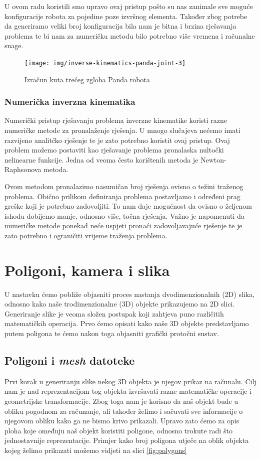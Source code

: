\documentclass[times, utf8, diplomskirad]{fer}
\begin{document}
U ovom radu koristili smo upravo ovaj pristup pošto su nas zanimale sve moguće konfiguracije robota za pojedine poze izvršnog elementa.
Također zbog potrebe da generiramo veliki broj konfiguracija bila nam je bitna i brzina rješavanja problema te bi nam za numeričku metodu bilo potrebno više vremena i računalne snage.
\begin{figure}[H]
    \centering
    \texttt{[image: img/inverse-kinematics-panda-joint-3]}
    \caption{Izračun kuta trećeg zgloba Panda robota}
    \label{fig:inv-kin-panda-joint-3}
\end{figure}

\subsection{Numerička inverzna kinematika}
Numerički pristup rješavanju problema inverzne kinematike koristi razne numeričke metode za pronalaženje rješenja.
U mnogo slučajeva nećemo imati razvijeno analitčko rješenje te je zato potrebno koristit ovaj pristup.
Ovaj problem možemo postaviti kao rješavanje problema pronalaska nultočki nelinearne funkcije.
Jedna od veoma često korištenih metoda je Newton-Raphsonova metoda.

Ovom metodom pronalazimo nasumičan broj rješenja ovisno o težini traženog problema.
Obično prilikom definiranja problema postavljamo i određeni prag greške koji je potrebno zadovoljiti.
To nam daje mogućnost da ovisno o željenom ishodu dobijemo manje, odnosno više, točna rješenja.
Važno je napomenuti da numeričke metode ponekad neće uspjeti pronaći zadovoljavajuće rješenje te je zato potrebno i ograničiti vrijeme traženja problema.


\chapter{Poligoni, kamera i slika}
\label{pog:kamera-i-slika}
U nastavku ćemo pobliže objasniti proces nastanja dvodimenzionalnih (2D) slika, odnosno kako naše trodimenzionalne (3D) objekte prikazujemo na 2D slici.
Generiranje slike je veoma složen postupak koji zahtjeva puno različitih matematičkih operacija.
Prvo ćemo opisati kako naše 3D objekte predstavljamo putem poligona te ćemo nakon toga objasniti grafički protočni sustav.

\section{Poligoni i \textit{mesh} datoteke}
\label{pog:poligoni-mesh}
Prvi korak u generiranju slike nekog 3D objekta je njegov prikaz na računalu.
Cilj nam je nad reprezentacijom tog objekta izvršavati razne matematičke operacije i geometrijske transformacije.
Zbog toga nam je korisno da naš objekt bude u obliku pogodnom za računanje, ali također želimo i sačuvati sve informacije o njegovom obliku kako ga ne bismo krivo prikazali.
Upravo zato ćemo za opis ploha koje omeđuju naš objekt koristiti poligone, odnosno trokute radi što jednostavnije reprezentacije.
Primjer kako broj poligona utječe na oblik objekta kojeg želimo prikazati možemo vidjeti na slici \ref{fig:polygons}
\end{document}
